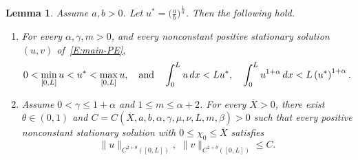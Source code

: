 \documentclass[11pt]{article} %
\newtheorem{lemma}{Lemma}[section]
\theoremstyle{remark}
\theoremstyle{remark}
\numberwithin{equation}{section}
\numberwithin{figure}{section}
\numberwithin{table}{section}
\begin{document}
\begin{lemma}\label{L:spiky-solu-lm1}
  Assume $a, b > 0$. Let $u^* = \big(\frac{a}{b}\big)^{\frac{1}{\alpha}}$. Then
  the following hold.
  \begin{enumerate}[(1)]
    \item For every $\alpha, \gamma, m > 0$, and every nonconstant positive
      stationary solution $(u,v)$ of~\eqref{E:main-PE},
      \begin{equation}\label{E:bound-u-eq1-2}
        0<\min_{[0,L]}u<u^*<\max_{[0,L]}u,
        \quad {\rm and}\quad
        \int_0^L u\,dx<Lu^*,\quad
        \int_0^L u^{1+\alpha}\,dx<L\left(u^*\right)^{1+\alpha}.
      \end{equation}

    \item Assume $0 < \gamma \le 1 + \alpha$ and ${1\le m\le \alpha+2}$. For
      every $\overline{X} > 0$, there exist $\theta \in (0, 1)$ and $ C =
      C(\overline{X}, a, b, \alpha, \gamma, \mu, \nu, L, m, \beta) > 0 $ such
      that every positive nonconstant stationary solution with $0 \le \chi_0 \le
      \overline{X}$ satisfies
      \begin{equation}\label{E:bound-u-eq3}
        \|u\|_{C^{2+\theta}([0,L])},\,\, \|v\|_{C^{2+\theta}([0,L])}\le C.
      \end{equation}
  \end{enumerate}
\end{lemma}
\end{document}
